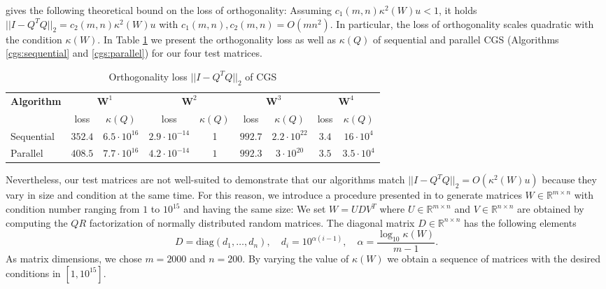 \documentclass{article}
\begin{document}
\citeauthor{Grigori:2023} \cite{Grigori:2023} gives the following theoretical
bound on the loss of orthogonality: Assuming \linebreak $c_1(m,n) \kappa^2(W) u
< 1$, it holds $||I - Q^T Q||_2 = c_2(m,n) \kappa^2(W) u$ with $c_1(m,n),
c_2(m,n) = O(mn^2)$. In particular, the loss of orthogonality scales quadratic
with the condition $\kappa(W)$. In Table \ref{tab:errorOrthoCGS} we present the
orthogonality loss as well as $\kappa(Q)$ of sequential and parallel CGS
(Algorithms \ref{cgs:sequential} and \ref{cgs:parallel}) for our four test
matrices.
\begin{table}[t]
    \centering
    \caption{Orthogonality loss $||I - Q^T Q||_2$ of CGS} \label{tab:errorOrthoCGS}
    \renewcommand{\arraystretch}{1.2}
    \begin{tabular}{|p{1.5cm}|c|c|c|c|c|c|c|c|}
      \hline
      \multirow{2}{1cm}{\textbf{Algorithm}} & \multicolumn{2}{c|}{$\textbf{W}^1$} &
      \multicolumn{2}{c|}{$\textbf{W}^2$} & \multicolumn{2}{c|}{$\textbf{W}^3$} &
      \multicolumn{2}{c|}{$\textbf{W}^4$}\\
      \cline{2-9}
      & loss & $\kappa(Q)$ & loss & $\kappa(Q)$
      & loss & $\kappa(Q)$ & loss & $\kappa(Q)$\\
      \hline
      Sequential    & $352.4$ & $6.5 \cdot 10^{16}$ & $2.9 \cdot 10^{-14}$ & 1
                        & $992.7$ & $2.2 \cdot 10^{22}$ & $3.4$ & $16 \cdot 10^4$ \\ \hline
      Parallel      & $408.5$ & $7.7 \cdot 10^{16}$ & $4.2 \cdot 10^{-14}$ & $1$
                        & $992.3$ & $3 \cdot 10^{20}$ & $3.5$ & $3.5 \cdot 10^4$ \\ \hline
    \end{tabular}
  \end{table}
Nevertheless, our test matrices are not well-suited to demonstrate that our
algorithms match $||I - Q^T Q||_2 = O(\kappa^2(W) u)$ because they vary in size
and condition at the same time. For this reason, we introduce a procedure
presented in \cite{Swirydowicz:2020} to generate matrices $W \in \mathbb{R}^{m
\times n}$ with condition number ranging from $1$ to $10^{15}$ and having the
same size: We set $W = U D V^T$ where $U \in \mathbb{R}^{m \times n}$ and $V \in
\mathbb{R}^{n \times n}$ are obtained by computing the $QR$ factorization of
normally distributed random matrices. The diagonal matrix $D \in \mathbb{R}^{n
\times n}$ has the following elements
\begin{equation*}
    D = \text{diag} (d_1, \ldots, d_n), \quad d_i = 10^{\alpha (i-1)}, \quad
    \alpha = \frac{\log_{10}\kappa(W)}{m - 1}.
\end{equation*}
As matrix dimensions, we chose $m = 2000$ and $n = 200$. By varying the value of
$\kappa(W)$ we obtain a sequence of matrices with the desired conditions in
$[1,10^{15}]$.
\end{document}
